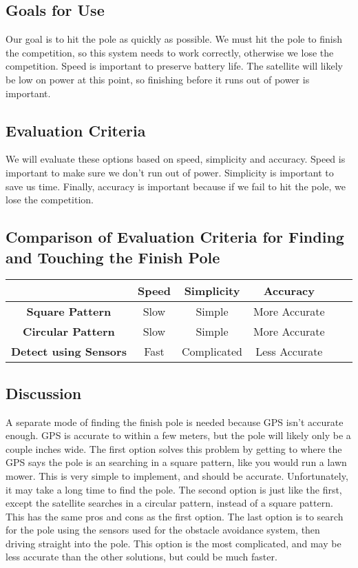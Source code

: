 \documentclass[10pt,letterpaper,onecolumn,journal]{IEEEtran}
\begin{document}
\subsection{Goals for Use}
Our goal is to hit the pole as quickly as possible. We must hit the pole to finish the competition, so this system needs to work correctly, otherwise we lose the competition. Speed is important to preserve battery life. The satellite will likely be low on power at this point, so finishing before it runs out of power is important.

\subsection{Evaluation Criteria}
We will evaluate these options based on speed, simplicity and accuracy. Speed is important to make sure we don’t run out of power. Simplicity is important to save us time. Finally, accuracy is important because if we fail to hit the pole, we lose the competition.
\subsection*{Comparison of Evaluation Criteria for Finding and Touching the Finish Pole}
\begin{center}
  \begin{tabular}{cccccc}
    \hline
    \multicolumn{1}{l}{} & \textbf{Speed} & \textbf{Simplicity}   & \textbf{Accuracy} \\
    \hline
    \textbf{Square Pattern}        & Slow  & Simple       & More Accurate  \\
    \hline
    \textbf{Circular Pattern}      & Slow  & Simple       & More Accurate \\
    \hline
    \textbf{Detect using Sensors}  & Fast  & Complicated  & Less Accurate  \\
    \hline
  \end{tabular}
\end{center}
\vspace{.3cm}
\subsection{Discussion}
A separate mode of finding the finish pole is needed because GPS isn’t accurate enough. GPS is accurate to within a few meters, but the pole will likely only be a couple inches wide. The first option solves this problem by getting to where the GPS says the pole is an searching in a square pattern, like you would run a lawn mower. This is very simple to implement, and should be accurate. Unfortunately, it may take a long time to find the pole. The second option is just like the first, except the satellite searches in a circular pattern, instead of a square pattern. This has the same pros and cons as the first option. The last option is to search for the pole using the sensors used for the obstacle avoidance system, then driving straight into the pole. This option is the most complicated, and may be less accurate than the other solutions, but could be much faster.
\end{document}
